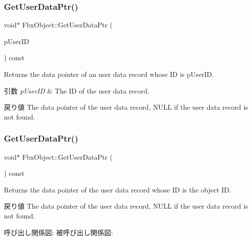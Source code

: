 \subsubsection{\texorpdfstring{Get\+User\+Data\+Ptr()}{GetUserDataPtr()}\hspace{0.1cm}{\footnotesize\ttfamily [1/2]}}
{\footnotesize\ttfamily void$\ast$ Fbx\+Object\+::\+Get\+User\+Data\+Ptr (\begin{DoxyParamCaption}\item[{const \hyperlink{fbxtypes_8h_a9beeca85cdc9941e912fe9eac7709b53}{Fbx\+U\+Int64} \&}]{p\+User\+ID }\end{DoxyParamCaption}) const}

Returns the data pointer of an user data record whose ID is p\+User\+ID. 
\begin{DoxyParams}{引数}
{\em p\+User\+ID} & The ID of the user data record. \\
\hline
\end{DoxyParams}
\begin{DoxyReturn}{戻り値}
The data pointer of the user data record, {\ttfamily N\+U\+LL} if the user data record is not found. 
\end{DoxyReturn}
\mbox{\label{class_fbx_object_ae1580cc0f041cf81bf0a3a96c4e00554}} 
\subsubsection{\texorpdfstring{Get\+User\+Data\+Ptr()}{GetUserDataPtr()}\hspace{0.1cm}{\footnotesize\ttfamily [2/2]}}
{\footnotesize\ttfamily void$\ast$ Fbx\+Object\+::\+Get\+User\+Data\+Ptr (\begin{DoxyParamCaption}{ }\end{DoxyParamCaption}) const}

Returns the data pointer of the user data record whose ID is the object ID. \begin{DoxyReturn}{戻り値}
The data pointer of the user data record, {\ttfamily N\+U\+LL} if the user data record is not found. 
\end{DoxyReturn}
呼び出し関係図\+:
被呼び出し関係図\+:
\mbox{\label{class_fbx_object_a14b73206429c6b2e9c4d6d934721d43a}} 
